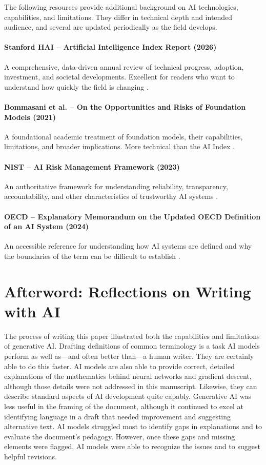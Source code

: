 \documentclass[11pt]{article}
\begin{document}
The following resources provide additional background on AI technologies, capabilities, and limitations. They differ in technical depth and intended audience, and several are updated periodically as the field develops.


\paragraph{Stanford HAI -- Artificial Intelligence Index Report (2026)}
A comprehensive, data-driven annual review of technical progress, adoption, investment, and societal developments. Excellent for readers who want to understand how quickly the field is changing \citep{StanfordHAI2026Index}.

\paragraph{Bommasani et al. -- On the Opportunities and Risks of Foundation Models (2021)}
A foundational academic treatment of foundation models, their capabilities, limitations, and broader implications. More technical than the AI Index \citep{Bommasani2021}.
  
\paragraph{NIST -- AI Risk Management Framework (2023)}
  An authoritative framework for understanding reliability, transparency, accountability, and other characteristics of trustworthy AI systems \citep{NIST2023AIRMF}.

\paragraph{OECD -- Explanatory Memorandum on the Updated OECD Definition of an AI System (2024)}
  An accessible reference for understanding how AI systems are defined and why the boundaries of the term can be difficult to establish \citep{OECD2024AIDefinition}.

\clearpage  
\section{Afterword: Reflections on Writing with AI}\label{sec:afterword}

The process of writing this paper illustrated both the capabilities and limitations of generative AI.
Drafting definitions of common terminology is a task AI models perform as well as---and often better than---a human writer. They are certainly able to do this faster.
AI models are also able to provide correct, detailed explanations of the mathematics behind neural networks and
gradient descent, although those details were not addressed in this manuscript.  Likewise, they can
describe standard aspects of AI development quite capably.
Generative AI was less useful in the framing of the document, although it continued to excel at
identifying language in a draft that needed improvement and suggesting alternative text.
AI models struggled most to identify gaps in explanations and to evaluate the document's pedagogy.
However, once these gaps and missing elements were flagged, AI models
were able to recognize the issues and to suggest helpful revisions.
\end{document}
